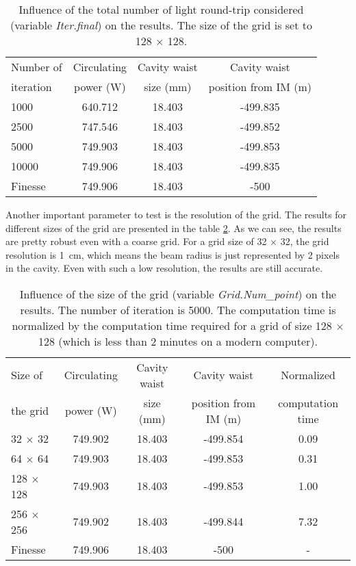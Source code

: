 \begin{table}[tbp]
  \centering
  \caption{\label{tab2:RT} Influence of the total number of light round-trip considered (variable \emph{Iter.final}) on the results. The size of the grid is set to 128 $\times$ 128.}
\begin{tabular}{|l|c|c|c|}
\hline
Number of  & Circulating & Cavity waist & Cavity waist \\
iteration &  power (W) & size (mm) &  position from IM (m) \\
\hline
1000 &  640.712 &  18.403 & -499.835 \\
2500 &  747.546 &  18.403 & -499.852 \\
5000 &  749.903 &  18.403 & -499.853 \\
10000 &  749.906 &  18.403 & -499.835 \\
\hline
\hline
Finesse &  749.906 &  18.403 & -500 \\
\hline
\end{tabular}
\end{table}

Another important parameter to test is the resolution of the grid. The results for different sizes of the grid are presented in the table \ref{tab2:grid_size}. As we can see, the results are pretty robust even with a coarse grid. For a grid size of 32 $\times$ 32, the grid resolution is 1~cm, which means the beam radius is just represented by 2 pixels in the cavity. Even with such a low resolution, the results are still accurate.

\begin{table}[tbp]
  \centering
  \caption{\label{tab2:grid_size} Influence of the size of the grid (variable \emph{Grid.Num\_point}) on the results. The number of iteration is 5000. The computation time is normalized by the computation time required for a grid of size 128 $\times$ 128 (which is less than 2 minutes on a modern computer).}
\begin{tabular}{|l|c|c|c|c|}
\hline
Size of   & Circulating & Cavity waist & Cavity waist & Normalized \\
the grid &  power (W) & size (mm) &  position from IM (m) & computation time\\
\hline
32 $\times$ 32 &  749.902 &  18.403 & -499.854 & 0.09 \\
64 $\times$ 64 &  749.903 &  18.403 & -499.853 & 0.31 \\
128 $\times$ 128 &  749.903 &  18.403 & -499.853 & 1.00 \\
256 $\times$ 256 &  749.902 & 18.403 & -499.844 & 7.32\\
\hline
\hline
Finesse &  749.906 &  18.403 & -500 & - \\
\hline
\end{tabular}
\end{table}


